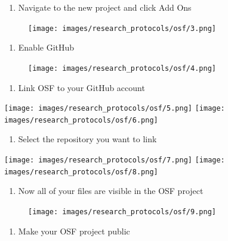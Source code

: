 \documentclass[
]{book}
\providecommand{\tightlist}{%
  \setlength{\itemsep}{0pt}\setlength{\parskip}{0pt}}
\begin{document}
\begin{enumerate}
\def\labelenumi{\arabic{enumi}.}
\setcounter{enumi}{2}
\tightlist
\item
  Navigate to the new project and click Add Ons
\end{enumerate}

\begin{figure}
\centering
\texttt{[image: images/research\_protocols/osf/3.png]}
\caption{}
\end{figure}

\begin{enumerate}
\def\labelenumi{\arabic{enumi}.}
\setcounter{enumi}{3}
\tightlist
\item
  Enable GitHub
\end{enumerate}

\begin{figure}
\centering
\texttt{[image: images/research\_protocols/osf/4.png]}
\caption{}
\end{figure}

\begin{enumerate}
\def\labelenumi{\arabic{enumi}.}
\setcounter{enumi}{4}
\tightlist
\item
  Link OSF to your GitHub account
\end{enumerate}

\texttt{[image: images/research\_protocols/osf/5.png]}
\texttt{[image: images/research\_protocols/osf/6.png]}

\begin{enumerate}
\def\labelenumi{\arabic{enumi}.}
\setcounter{enumi}{5}
\tightlist
\item
  Select the repository you want to link
\end{enumerate}

\texttt{[image: images/research\_protocols/osf/7.png]}
\texttt{[image: images/research\_protocols/osf/8.png]}

\begin{enumerate}
\def\labelenumi{\arabic{enumi}.}
\setcounter{enumi}{6}
\tightlist
\item
  Now all of your files are visible in the OSF project
\end{enumerate}

\begin{figure}
\centering
\texttt{[image: images/research\_protocols/osf/9.png]}
\caption{}
\end{figure}

\begin{enumerate}
\def\labelenumi{\arabic{enumi}.}
\setcounter{enumi}{7}
\tightlist
\item
  Make your OSF project public
\end{enumerate}
\end{document}
